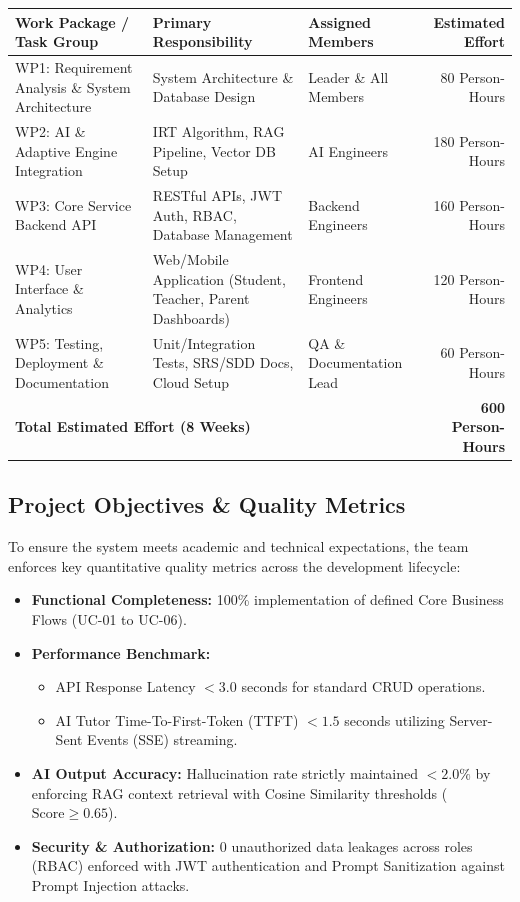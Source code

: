 \documentclass[12pt,a4paper]{article}
\begin{document}
\begin{table}[H]
\centering
\small
\renewcommand{\arraystretch}{1.3}
\begin{tabularx}{\textwidth}{p{3.8cm} p{4.2cm} p{3.2cm} r}
\toprule
\textbf{Work Package / Task Group} & \textbf{Primary Responsibility} & \textbf{Assigned Members} & \textbf{Estimated Effort} \\
\midrule
WP1: Requirement Analysis \& System Architecture & System Architecture \& Database Design & Leader \& All Members & 80 Person-Hours \\
\addlinespace[0.3em]
WP2: AI \& Adaptive Engine Integration & IRT Algorithm, RAG Pipeline, Vector DB Setup & AI Engineers & 180 Person-Hours \\
\addlinespace[0.3em]
WP3: Core Service Backend API & RESTful APIs, JWT Auth, RBAC, Database Management & Backend Engineers & 160 Person-Hours \\
\addlinespace[0.3em]
WP4: User Interface \& Analytics & Web/Mobile Application (Student, Teacher, Parent Dashboards) & Frontend Engineers & 120 Person-Hours \\
\addlinespace[0.3em]
WP5: Testing, Deployment \& Documentation & Unit/Integration Tests, SRS/SDD Docs, Cloud Setup & QA \& Documentation Lead & 60 Person-Hours \\
\midrule
\multicolumn{3}{l}{\textbf{Total Estimated Effort (8 Weeks)}} & \textbf{600 Person-Hours} \\
\bottomrule
\end{tabularx}
\end{table}

\subsection{Project Objectives \& Quality Metrics}
To ensure the system meets academic and technical expectations, the team enforces key quantitative quality metrics across the development lifecycle:
\begin{itemize}[leftmargin=1.5em, itemsep=0.2em]
    \item \textbf{Functional Completeness:} 100\% implementation of defined Core Business Flows (UC-01 to UC-06).
    \item \textbf{Performance Benchmark:}
    \begin{itemize}[leftmargin=1.5em, itemsep=0.1em]
        \item API Response Latency $< 3.0$ seconds for standard CRUD operations.
        \item AI Tutor Time-To-First-Token (TTFT) $< 1.5$ seconds utilizing Server-Sent Events (SSE) streaming.
    \end{itemize}
    \item \textbf{AI Output Accuracy:} Hallucination rate strictly maintained $< 2.0\%$ by enforcing RAG context retrieval with Cosine Similarity thresholds ($\text{Score} \ge 0.65$).
    \item \textbf{Security \& Authorization:} 0 unauthorized data leakages across roles (RBAC) enforced with JWT authentication and Prompt Sanitization against Prompt Injection attacks.
\end{itemize}
\end{document}
